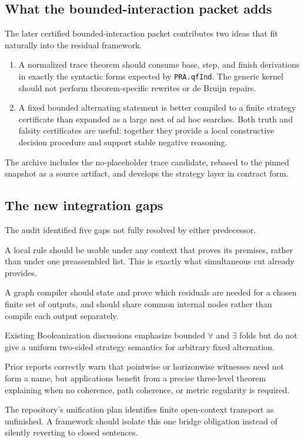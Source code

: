 \subsection{What the bounded-interaction packet adds}

The later certified bounded-interaction packet contributes two ideas that fit naturally into the residual framework.
\begin{enumerate}
  \item A normalized trace theorem should consume base, step, and finish derivations in exactly the syntactic forms expected by \texttt{PRA.qfInd}.  The generic kernel should not perform theorem-specific rewrites or de Bruijn repairs.
  \item A fixed bounded alternating statement is better compiled to a finite strategy certificate than expanded as a large nest of ad hoc searches.  Both truth and falsity certificates are useful: together they provide a local constructive decision procedure and support stable negative reasoning.
\end{enumerate}
The archive includes the no-placeholder trace candidate, rebased to the pinned snapshot as a source artifact, and develops the strategy layer in contract form.

\subsection{The new integration gaps}

The audit identified five gaps not fully resolved by either predecessor.
\begin{description}[style=nextline,leftmargin=0pt]
  \item[Context polymorphism.] A local rule should be usable under any context that proves its premises, rather than under one preassembled list.  This is exactly what simultaneous cut already provides.
  \item[Multi-query minimality.] A graph compiler should state and prove which residuals are needed for a chosen finite set of outputs, and should share common internal nodes rather than compile each output separately.
  \item[Bounded alternation.] Existing Booleanization discussions emphasize bounded \(\forall\) and \(\exists\) folds but do not give a uniform two-sided strategy semantics for arbitrary fixed alternation.
  \item[Coherence levels.] Prior reports correctly warn that pointwise or horizonwise witnesses need not form a name, but applications benefit from a precise three-level theorem explaining when no coherence, path coherence, or metric regularity is required.
  \item[Open backend transport.] The repository's unification plan identifies finite open-context transport as unfinished.  A framework should isolate this one bridge obligation instead of silently reverting to closed sentences.
\end{description}

